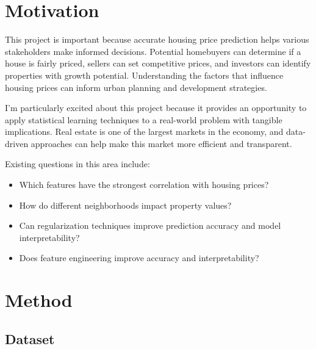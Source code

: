 \documentclass{article}
\begin{document}


\section{Motivation}
This project is important because accurate housing price prediction helps various stakeholders make informed decisions. Potential homebuyers can determine if a house is fairly priced, sellers can set competitive prices, and investors can identify properties with growth potential. Understanding the factors that influence housing prices can inform urban planning and development strategies.

I'm particularly excited about this project because it provides an opportunity to apply statistical learning techniques to a real-world problem with tangible implications. Real estate is one of the largest markets in the economy, and data-driven approaches can help make this market more efficient and transparent.

Existing questions in this area include:
\begin{itemize}
    \item Which features have the strongest correlation with housing prices?
    \item How do different neighborhoods impact property values?
    \item Can regularization techniques improve prediction accuracy and model interpretability?
    \item Does feature engineering improve accuracy and interpretability?
\end{itemize}

\section{Method}

\subsection{Dataset}
\end{document}
